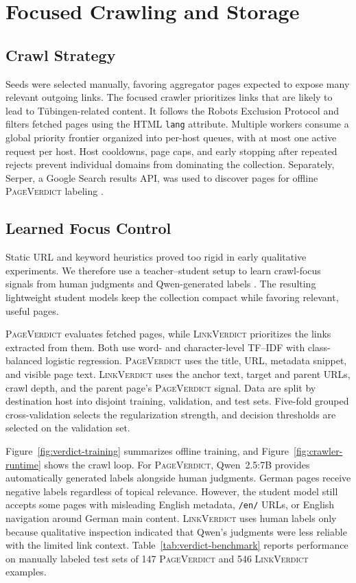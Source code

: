 \documentclass{article}
\begin{document}
\section{Focused Crawling and Storage}
\subsection{Crawl Strategy}
Seeds were selected manually, favoring aggregator pages expected to expose
many relevant outgoing links. The focused crawler prioritizes links that are
likely to lead to Tübingen-related content. It follows the Robots Exclusion
Protocol \citep{rfc9309} and filters fetched pages using the HTML
\texttt{lang} attribute. Multiple
workers consume a global priority frontier organized into per-host queues,
with at most one active request per host. Host cooldowns, page caps, and early
stopping after repeated rejects prevent individual domains from dominating the
collection.
Separately, Serper, a Google Search results API, was used to discover pages
for offline \textsc{PageVerdict} labeling \citep{serper}.

\subsection{Learned Focus Control}
Static URL and keyword heuristics proved too rigid in early qualitative
experiments. We therefore use a teacher--student setup to learn crawl-focus
signals from human judgments and Qwen-generated labels \citep{qwen25}. The resulting
lightweight student models keep the collection compact while favoring relevant,
useful pages.

\textsc{PageVerdict} evaluates fetched pages, while \textsc{LinkVerdict}
prioritizes the links extracted from them. Both use word- and character-level
TF--IDF with class-balanced logistic regression. \textsc{PageVerdict} uses the
title, URL, metadata snippet, and visible page text. \textsc{LinkVerdict} uses
the anchor text, target and parent URLs, crawl depth, and the parent page's
\textsc{PageVerdict} signal. Data are split by destination host into disjoint
training, validation, and test sets. Five-fold grouped cross-validation selects
the regularization strength, and decision thresholds are selected on the
validation set.

Figure~\ref{fig:verdict-training} summarizes offline training, and
Figure~\ref{fig:crawler-runtime} shows the crawl loop. For
\textsc{PageVerdict}, Qwen~2.5:7B provides automatically generated labels alongside human
judgments. German pages receive negative labels regardless of topical
relevance. However, the student model still accepts some pages with misleading
English metadata, \texttt{/en/} URLs, or English navigation around German main
content.
\textsc{LinkVerdict} uses human labels only because qualitative
inspection indicated that Qwen's judgments were less reliable with the limited
link context. Table~\ref{tab:verdict-benchmark}
reports performance on manually labeled test sets of 147 \textsc{PageVerdict}
and 546 \textsc{LinkVerdict} examples.
\end{document}
